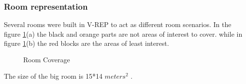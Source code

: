 \subsubsection{Room representation}
\hfill

Several rooms were built in V-REP to act as different room scenarios. In the figure \ref{fig:final_room}(a) the black and orange parts are not areas of interest to cover. while in figure \ref{fig:final_room}(b) the red blocks are the areas of least interest.

\begin{figure}[!htb]
  \centering
  \hfill
  \caption{Room Coverage}
  
  \label{fig:final_room}
\end{figure}

The size of the big room is 15*14 $meters^{2}$ . 


